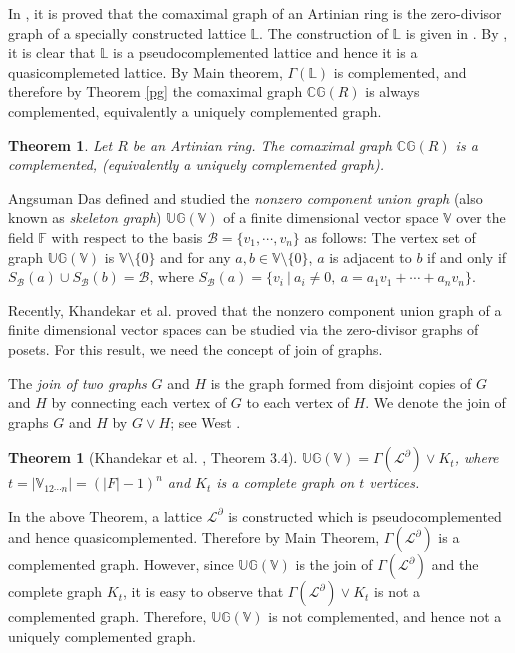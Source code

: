 \documentclass[10pt,one side,emlines]{amsart}
\newtheorem{thm}[lem]{Theorem}
\theoremstyle{definition}
\begin{document}
In \cite{GKJ}, it is proved that the comaximal graph of an Artinian ring is the zero-divisor graph of a specially constructed lattice $\mathbb{L}$. The construction of $\mathbb{L}$ is given in \cite[Construction 3.6]{GKJ}. By \cite[Corollary 3.9 and Theorem 3.16]{GKJ}, it is clear that $\mathbb{L}$
is a pseudocomplemented lattice and hence it is a quasicomplemeted lattice. By  Main theorem, $\Gamma(\mathbb{L})$ is complemented, and therefore by Theorem \ref{pg} the comaximal graph $\mathbb{CG}(R)$ is always  complemented, equivalently a uniquely complemented graph. 

\begin{thm} Let $R$ be an Artinian ring. The comaximal graph $\mathbb{CG}(R)$ is a complemented, (equivalently a uniquely complemented graph).  
\end{thm}



 Angsuman Das \cite{AD} defined and studied the \textit{nonzero component union graph} (also known as \textit{skeleton graph}) $\mathbb{UG(V)}$ of a finite dimensional vector space $\mathbb{V}$ over the field $\mathbb{F}$ with respect to the basis $\mathcal{B} = \{v_1, \cdots , v_n\}$ as follows: The vertex set of graph $\mathbb{UG(V)}$ is $\mathbb{V} \setminus \{0\}$ and for any $a, b \in \mathbb{V} \setminus \{0\}$, $a$ is adjacent to $b$ if and only if $S_\mathcal{B}(a) \cup S_\mathcal{B}(b) = \mathcal{B}$, where $S_\mathcal{B}(a)=\{v_i ~|~ a_i \neq 0, ~a = a_1v_1 +\cdots + a_nv_n\}$.
 
  Recently, Khandekar et al. \cite{KCJ} proved that the nonzero component union graph of a finite dimensional vector spaces can be studied via the zero-divisor graphs of posets. For this result, we need the concept of join of graphs.
	
	The \textit{join of two graphs} $G$ and $H$ is the graph formed from disjoint copies of $G$ and $H$ by connecting each vertex of $G$ to each vertex of $H$. We denote the join of graphs $G$ and $H$
	by $G \vee H$; see West \cite{W}.
	
	
\begin{thm}[Khandekar et al. \cite{KCJ}, Theorem 3.4] $\mathbb{UG(V)} = \Gamma(\mathcal{L^\partial}) \vee K_t$, where $t = |\mathbb{V}_{12 \cdots n}| = (|F|-1)^n$ and $K_t$ is a complete graph on $t$ vertices.
\end{thm}

In the above Theorem, a lattice $\mathcal{L}^\partial$ is constructed which is pseudocomplemented and hence quasicomplemented. Therefore by Main Theorem, $\Gamma(\mathcal{L^\partial})$ is a complemented graph. However, since $\mathbb{UG(V)}$ is the join of $ \Gamma(\mathcal{L^\partial})$ and the complete graph  $K_t$,  it is easy to observe that  $\Gamma(\mathcal{L^\partial}) \vee K_t$ is not a complemented graph. Therefore, $\mathbb{UG(V)}$ is not  complemented, and hence not a uniquely complemented graph. 
\end{document}
